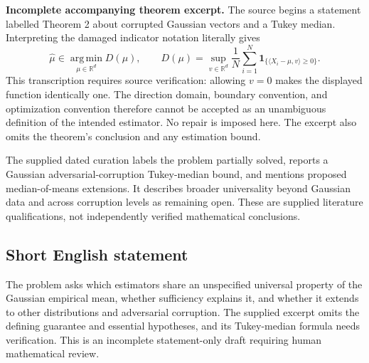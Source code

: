 \documentclass[11pt]{article}
\newcommand{\R}{\mathbb{R}}
\begin{document}
\textbf{Incomplete accompanying theorem excerpt.} The source begins a statement labelled Theorem 2 about corrupted Gaussian vectors and a Tukey median. Interpreting the damaged indicator notation literally gives
\[
\widehat\mu\in\operatorname*{arg\,min}_{\mu\in\R^d}D(\mu),\qquad
D(\mu)=\sup_{v\in\R^d}\frac1N\sum_{i=1}^N
\mathbf{1}_{\{\langle X_i-\mu,v\rangle\geq0\}}.
\]
This transcription requires source verification: allowing \(v=0\) makes the displayed function identically one. The direction domain, boundary convention, and optimization convention therefore cannot be accepted as an unambiguous definition of the intended estimator. No repair is imposed here. The excerpt also omits the theorem's conclusion and any estimation bound.

The supplied dated curation labels the problem partially solved, reports a Gaussian adversarial-corruption Tukey-median bound, and mentions proposed median-of-means extensions. It describes broader universality beyond Gaussian data and across corruption levels as remaining open. These are supplied literature qualifications, not independently verified mathematical conclusions.
\subsection{Short English statement}
The problem asks which estimators share an unspecified universal property of the Gaussian empirical mean, whether sufficiency explains it, and whether it extends to other distributions and adversarial corruption. The supplied excerpt omits the defining guarantee and essential hypotheses, and its Tukey-median formula needs verification. This is an incomplete statement-only draft requiring human mathematical review.
\end{document}
